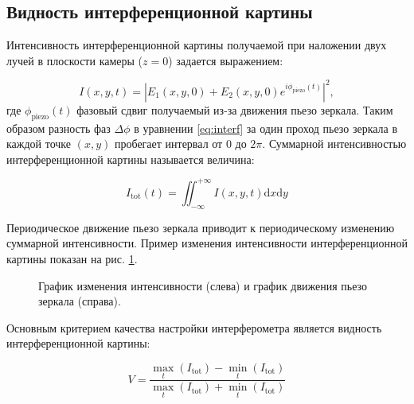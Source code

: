 \subsection{Видность интерференционной картины}\label{sec:ch2/sec1/subsec3}

Интенсивность интерференционной картины получаемой при наложении двух лучей в плоскости камеры ($z=0$) задается выражением:

\begin{equation}
    I(x,y,t)=|E_1(x,y,0)+E_2(x,y,0)e^{i\phi_{\mathrm{piezo}}(t)}|^2,
\label{eq:I_def}
\end{equation}
где $\phi_{\mathrm{piezo}}(t)$ фазовый сдвиг получаемый из-за движения пьезо зеркала. Таким образом разность фаз $\Delta \phi$ в уравнении \eqref{eq:interf} за один проход пьезо зеркала в каждой точке $(x, y)$ пробегает интервал от $0$ до $2\pi$. Суммарной интенсивностью интерференционной картины называется величина: 

\begin{equation}
    I_{\mathrm{tot}}(t) = \iint_{-\infty}^{+\infty} I(x, y, t) {\mathrm{d}}x{\mathrm{d}}y
\end{equation}

Периодическое движение пьезо зеркала приводит к периодическому изменению суммарной интенсивности. Пример изменения интенсивности интерференционной картины показан на рис. \ref{fig:intens_plot}.

\begin{figure}[ht]
\caption{График изменения интенсивности (слева) и график движения пьезо зеркала (справа).}
\label{fig:intens_plot}
\end{figure}

Основным критерием качества настройки интерферометра является видность интерференционной картины: 

\begin{equation}
    V = \frac{            
        \max_{t}(I_{\mathrm{tot}}) - \min_t(I_{\mathrm{tot}})}
        {\max_{t}(I_{\mathrm{tot}}) + \min_t(I_{\mathrm{tot}})}
    \label{eq:visib}
\end{equation}

